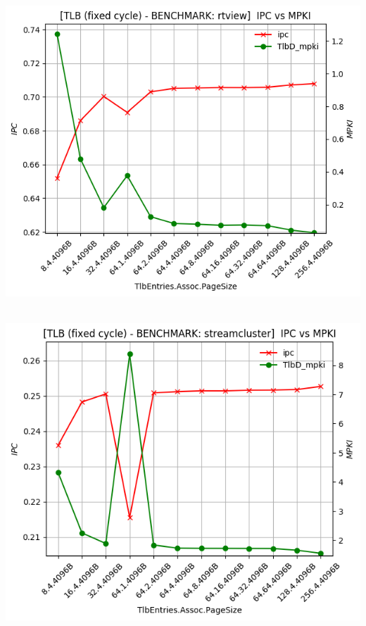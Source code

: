 \begin{minipage}{\textwidth}
    \begin{center}
        \\
        \vspace{3mm}
        \includegraphics[scale=0.70]{graphs/TLB/fixed/rtview.png}
        \vspace{6mm}
    \end{center}
\end{minipage}

\begin{minipage}{\textwidth}
    \begin{center}
        \\
        \vspace{3mm}
        \includegraphics[scale=0.70]{graphs/TLB/fixed/streamcluster.png}
        \vspace{6mm}
    \end{center}
\end{minipage}

